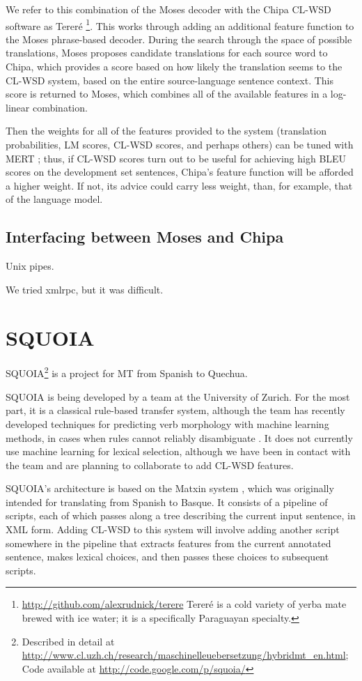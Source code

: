 We refer to this combination of the Moses decoder with the Chipa CL-WSD
software as Tereré \footnote{\url{http://github.com/alexrudnick/terere}
Tereré is a cold variety of yerba mate brewed with ice water; it is a
specifically Paraguayan specialty.}. This works through adding an additional
feature function to the Moses phrase-based decoder. During the search through
the space of possible translations, Moses proposes candidate translations for
each source word to Chipa, which provides a score based on how likely the
translation seems to the CL-WSD system, based on the entire source-language
sentence context. This score is returned to Moses, which combines all of the
available features in a log-linear combination.

Then the weights for all of the features provided to the system (translation
probabilities, LM scores, CL-WSD scores, and perhaps others) can be tuned with
MERT \cite{och:2003:ACL}; thus, if CL-WSD scores turn out to be useful for
achieving high BLEU scores on the development set sentences, Chipa's feature
function will be afforded a higher weight. If not, its advice could carry less
weight, than, for example, that of the language model.

\subsection{Interfacing between Moses and Chipa}
Unix pipes.

We tried xmlrpc, but it was difficult.

\section{SQUOIA}
SQUOIA\footnote{Described in detail at
\url{http://www.cl.uzh.ch/research/maschinelleuebersetzung/hybridmt_en.html}; 
Code available at \url{http://code.google.com/p/squoia/}}
is a project for MT from Spanish to Quechua.

SQUOIA is being developed by a team at the University of Zurich. For the most
part, it is a classical rule-based transfer system, although the team has
recently developed techniques for predicting verb morphology with machine
learning methods, in cases when rules cannot reliably disambiguate
\cite{riosgonzales-gohring:2013:HyTra}. It does not currently use machine
learning for lexical selection, although we have been in contact with the team
and are planning to collaborate to add CL-WSD features.

SQUOIA's architecture is based on the Matxin system \cite{matxin2005}, which
was originally intended for translating from Spanish to Basque.
It consists of a pipeline of scripts, each of which passes along a tree
describing the current input sentence, in XML form. Adding CL-WSD to this
system will involve adding another script somewhere in the pipeline that
extracts features from the current annotated sentence, makes lexical choices,
and then passes these choices to subsequent scripts.


